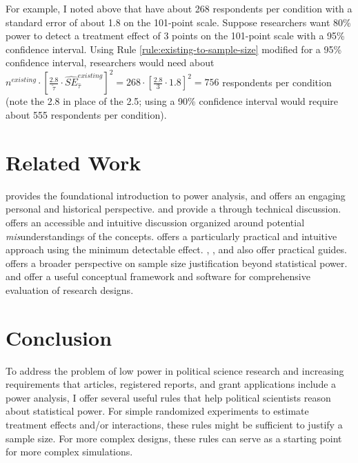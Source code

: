 \documentclass[12pt]{article}
\begin{document}
For example, I noted above that \cite{Ahler2018} have about 268 respondents per condition with a standard error of about 1.8 on the 101-point scale. 
Suppose researchers want 80\% power to detect a treatment effect of 3 points on the 101-point scale with a 95\% confidence interval.
Using Rule \ref{rule:existing-to-sample-size} modified for a 95\% confidence interval, researchers would need about $n^{existing} \cdot \left\lbrack \frac{2.8}{\widetilde{\tau}} \cdot {\widehat{SE}}_{\widehat{\tau}}^{existing} \right\rbrack^{2} = 268 \cdot \left\lbrack \frac{2.8}{3} \cdot 1.8 \right\rbrack^{2} = 756$ respondents per condition (note the 2.8 in place of the 2.5; using a 90\% confidence interval would require about 555 respondents per condition).

\section*{Related Work}

\cite{Cohen1988} provides the foundational introduction to power analysis, and \cite{Cohen1990} offers an engaging personal and historical perspective.
\citet[ch. 9]{DeGroot2010} and \citet[ch. 8]{Casella2002} provide a through technical discussion. 
\cite{Greenland2016} offers an accessible and intuitive discussion organized around potential \textit{mis}understandings of the concepts.
\cite{Bloom1995} offers a particularly practical and intuitive approach using the minimum detectable effect.
\cite{Cohen1992}, \cite{Lenth2001}, and \cite{Meyvis2017} also offer practical guides.
\cite{Lakens2022} offers a broader perspective on sample size justification beyond statistical power.
\cite{Blair2019} and \cite{Blair2023} offer a useful conceptual framework and software for comprehensive evaluation of research designs.

\section*{Conclusion}

To address the problem of low power in political science research \citep{ArelBundock2022} and increasing requirements that articles, registered reports, and grant applications include a power analysis, I offer several useful rules that help political scientists reason about statistical power. 
For simple randomized experiments to estimate treatment effects and/or interactions, these rules might be sufficient to justify a sample size.
For more complex designs, these rules can serve as a starting point for more complex simulations.
\end{document}
